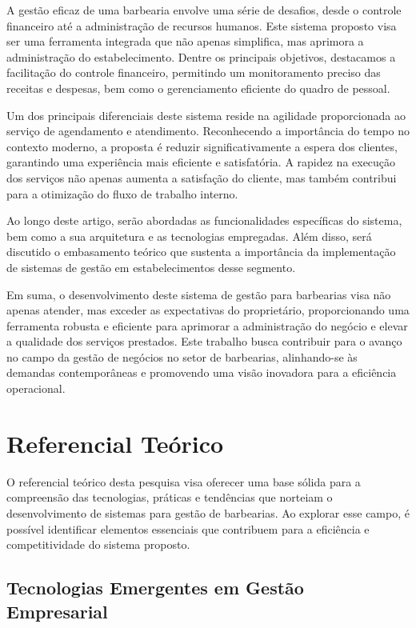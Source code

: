 \documentclass[12pt]{article}
\begin{document}
A gestão eficaz de uma barbearia envolve uma série de desafios, desde o controle financeiro até a administração de recursos humanos. Este sistema proposto visa ser uma ferramenta integrada que não apenas simplifica, mas aprimora a administração do estabelecimento. Dentre os principais objetivos, destacamos a facilitação do controle financeiro, permitindo um monitoramento preciso das receitas e despesas, bem como o gerenciamento eficiente do quadro de pessoal.


Um dos principais diferenciais deste sistema reside na agilidade proporcionada ao serviço de agendamento e atendimento. Reconhecendo a importância do tempo no contexto moderno, a proposta é reduzir significativamente a espera dos clientes, garantindo uma experiência mais eficiente e satisfatória. A rapidez na execução dos serviços não apenas aumenta a satisfação do cliente, mas também contribui para a otimização do fluxo de trabalho interno.


Ao longo deste artigo, serão abordadas as funcionalidades específicas do sistema, bem como a sua arquitetura e as tecnologias empregadas. Além disso, será discutido o embasamento teórico que sustenta a importância da implementação de sistemas de gestão em estabelecimentos desse segmento.


Em suma, o desenvolvimento deste sistema de gestão para barbearias visa não apenas atender, mas exceder as expectativas do proprietário, proporcionando uma ferramenta robusta e eficiente para aprimorar a administração do negócio e elevar a qualidade dos serviços prestados. Este trabalho busca contribuir para o avanço no campo da gestão de negócios no setor de barbearias, alinhando-se às demandas contemporâneas e promovendo uma visão inovadora para a eficiência operacional.


\section{Referencial Teórico}

O referencial teórico desta pesquisa visa oferecer uma base sólida para a compreensão das tecnologias, práticas e tendências que norteiam o desenvolvimento de sistemas para gestão de barbearias. Ao explorar esse campo, é possível identificar elementos essenciais que contribuem para a eficiência e competitividade do sistema proposto.

\subsection{Tecnologias Emergentes em Gestão Empresarial}
\end{document}
